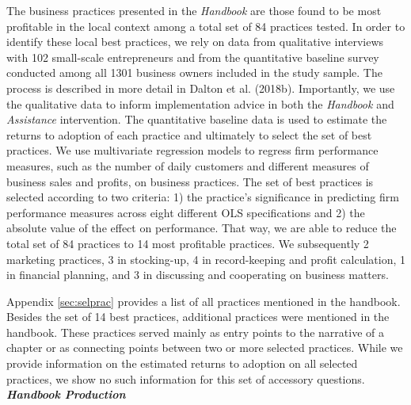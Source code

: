 \documentclass[11.5pt]{article}
\begin{document}
{The business practices presented in the \emph{Handbook} are those found to be most profitable in the local context among a total set of 84 practices tested. In order to identify these local best practices, we rely on data from qualitative interviews with 102 small-scale entrepreneurs and from the quantitative baseline survey conducted among all 1301 business owners included in the study sample. The process is described in more detail in Dalton et al. (2018b). Importantly, we use the qualitative data to inform implementation advice in both the \emph{Handbook} and \emph{Assistance} intervention. The quantitative baseline data is used to estimate the returns to adoption of each practice and ultimately to select the set of best practices. We use multivariate regression models to regress firm performance measures, such as the number of daily customers and different measures of business sales and profits, on business practices. The set of best practices is selected according to two criteria: 1) the practice's significance in predicting firm performance measures across eight different OLS specifications and 2) the absolute value of the effect on performance. That way, we are able to reduce the total set of 84 practices to 14 most profitable practices. We subsequently 2 marketing practices, 3 in stocking-up, 4 in record-keeping and profit calculation, 1 in financial planning, and 3 in discussing and cooperating on business matters. 

Appendix \ref{sec:selprac} provides a list of all practices mentioned in the handbook. Besides the set of 14 best practices, additional practices were mentioned in the handbook. These practices served mainly as entry points to the narrative of a chapter or as connecting points between two or more selected practices. While we provide information on the estimated returns to adoption on all selected practices, we show no such information for this set of accessory questions. \\

\noindent \emph{\textbf{Handbook Production}}\

}
\end{document}
